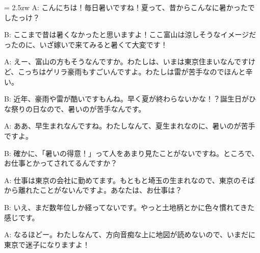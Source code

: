 \documentclass[11pt]{amsart}
\title{}
\author{}
\newenvironment{hangall}[1]{\hangindent = 2.5zw\everypar{\hangindent = 2.5zw}}{}
\begin{document}
\maketitle
\begin{hangall}{}%
A: こんにちは！毎日暑いですね！夏って、昔からこんなに暑かったでしたっけ？



B: ここまで昔は暑くなかったと思いますよ！ここ富山は涼しそうなイメージだったのに、いざ嫁いで来てみると暑くて大変です！



A: えー、富山の方もそうなんですか。わたしは、いまは東京住まいなんですけど、こっちはゲリラ豪雨もすごいんですよ。わたしは雷が苦手なのでほんと辛い。



B: 近年、豪雨や雷が酷いですもんね。早く夏が終わらないかな！？誕生日がひな祭りの日なので、暑いのが苦手なんです。



A: ああ、早生まれなんですね。わたしなんて、夏生まれなのに、暑いのが苦手ですよ。



B: 確かに、「暑いの得意！」って人をあまり見たことがないですね。ところで、お仕事とかってされてるんですか？



A: 仕事は東京の会社に勤めてます。もともと埼玉の生まれなので、東京のそばから離れたことがないんですよ。あなたは、お仕事は？



B: いえ、まだ数年位しか経ってないです。やっと土地柄とかに色々慣れてきた感じです。



A: なるほどー。わたしなんて、方向音痴な上に地図が読めないので、いまだに東京で迷子になりますよ！\end{hangall}
\end{document}

